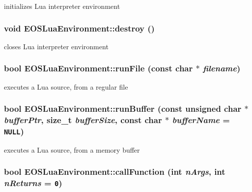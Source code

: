 initializes Lua interpreter environment 

\hypertarget{classEOSLuaEnvironment_30d30f126d7c66533bfc73cc580ea9de}{
\subsubsection[{destroy}]{\setlength{\rightskip}{0pt plus 5cm}void EOSLuaEnvironment::destroy ()}}
\label{classEOSLuaEnvironment_30d30f126d7c66533bfc73cc580ea9de}


closes Lua interpreter environment 

\hypertarget{classEOSLuaEnvironment_c1657fa448dfda93c41f1a09a77aa91e}{
\subsubsection[{runFile}]{\setlength{\rightskip}{0pt plus 5cm}bool EOSLuaEnvironment::runFile (const char $\ast$ {\em filename})}}
\label{classEOSLuaEnvironment_c1657fa448dfda93c41f1a09a77aa91e}


executes a Lua source, from a regular file 

\hypertarget{classEOSLuaEnvironment_2c229ac186b5df733a1b2177fd7218aa}{
\subsubsection[{runBuffer}]{\setlength{\rightskip}{0pt plus 5cm}bool EOSLuaEnvironment::runBuffer (const unsigned char $\ast$ {\em bufferPtr}, \/  size\_\-t {\em bufferSize}, \/  const char $\ast$ {\em bufferName} = {\tt NULL})}}
\label{classEOSLuaEnvironment_2c229ac186b5df733a1b2177fd7218aa}


executes a Lua source, from a memory buffer 

\hypertarget{classEOSLuaEnvironment_dad2df9fe00ab74fa40f61e65b64d041}{
\subsubsection[{callFunction}]{\setlength{\rightskip}{0pt plus 5cm}bool EOSLuaEnvironment::callFunction (int {\em nArgs}, \/  int {\em nReturns} = {\tt 0})}}
\label{classEOSLuaEnvironment_dad2df9fe00ab74fa40f61e65b64d041}


